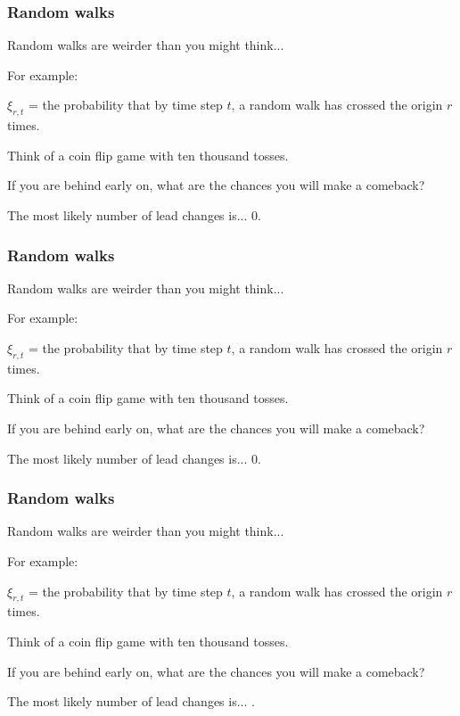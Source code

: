 \begin{frame}
  \frametitle{Random walks}

  Random walks are weirder than you might think...

  For example:

  $\xi_{r,t}$ = the probability that by time step $t$,
  a random walk has crossed the origin $r$ times.

  \inv

  Think of a coin flip game with ten thousand tosses.

  If you are behind early on, what are the chances you
  will make a comeback?

  The most likely number of lead changes is...  
  0.



\end{frame}

\begin{frame}
  \frametitle{Random walks}

  Random walks are weirder than you might think...

  For example:

  $\xi_{r,t}$ = the probability that by time step $t$,
  a random walk has crossed the origin $r$ times.

  Think of a coin flip game with ten thousand tosses.

  If you are behind early on, what are the chances you
  will make a comeback?

  \inv 

  The most likely number of lead changes is...  
  0.


\end{frame}

\begin{frame}
  \frametitle{Random walks}

  Random walks are weirder than you might think...

  For example:

  $\xi_{r,t}$ = the probability that by time step $t$,
  a random walk has crossed the origin $r$ times.

  Think of a coin flip game with ten thousand tosses.

  If you are behind early on, what are the chances you
  will make a comeback?

  The most likely number of lead changes is...  
  .


\end{frame}

